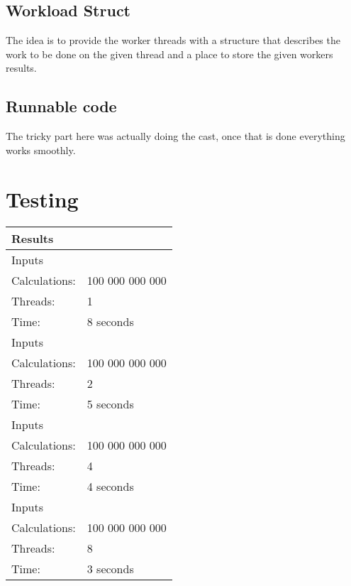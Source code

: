 \subsection{Workload Struct}
The idea is to provide the worker threads with a structure that describes the work to be done on the given thread and a place to store the given workers results.



\subsection{Runnable code}
The tricky part here was actually doing the cast, once that is done everything works smoothly.




\section{Testing}



\newcommand{\rowhead}[1] {
\multicolumn{2}{l}{#1}\\
\hline
}

\newcommand{\row}[3] {
\hline
\rowcolor{gr1}
Inputs&\\
\hline \hline
\rowcolor{gr2}
Calculations: & #1 \\
\hline
\rowcolor{gr2}
Threads: & #2 \\
\hline
\rowcolor{gr2}
Time: & #3 \\
\hline \hline
}

\newcommand{\botrow}[3] {
\hline
\rowcolor{gr1}
Inputs&\\
\hline \hline
\rowcolor{gr2}
N = & #1 \\
\hline
\rowcolor{gr2}
Threads: & #2 \\
\hline
\rowcolor{gr2}
Time: & #3 \\
\hline
}

\begin{table}[ht]
\begin{tabular}{| p{} | p{} |}
\rowhead{Results}
\row{100 000 000 000}{1}{8 seconds}
\row{100 000 000 000}{2}{5 seconds}
\row{100 000 000 000}{4}{4 seconds}
\row{100 000 000 000}{8}{3 seconds}
\end{tabular}
\end{table}